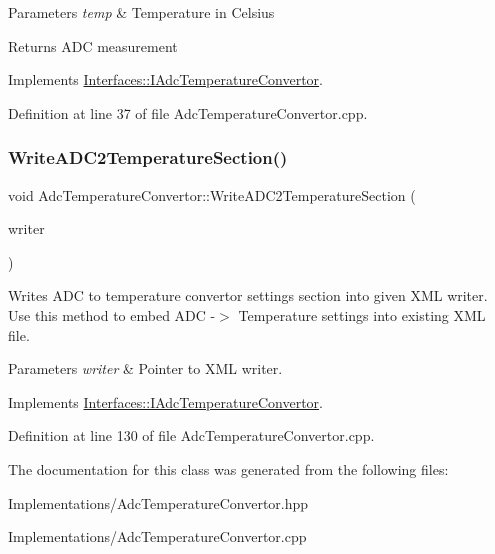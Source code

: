 \begin{DoxyParams}{Parameters}
{\em temp} & Temperature in Celsius \\
\hline
\end{DoxyParams}
\begin{DoxyReturn}{Returns}
A\+DC measurement 
\end{DoxyReturn}


Implements \hyperlink{class_interfaces_1_1_i_adc_temperature_convertor_ab5d3453ecc41848b723a790fe7e01f79}{Interfaces\+::\+I\+Adc\+Temperature\+Convertor}.



Definition at line 37 of file Adc\+Temperature\+Convertor.\+cpp.

\mbox{\label{class_adc_temperature_convertor_aa06c19d0ac9f45d6f2f67718eda042ac}} 
\subsubsection{\texorpdfstring{Write\+A\+D\+C2\+Temperature\+Section()}{WriteADC2TemperatureSection()}}
{\footnotesize\ttfamily void Adc\+Temperature\+Convertor\+::\+Write\+A\+D\+C2\+Temperature\+Section (\begin{DoxyParamCaption}\item[{Q\+Xml\+Stream\+Writer $\ast$}]{writer }\end{DoxyParamCaption})\hspace{0.3cm}{\ttfamily [virtual]}}



Writes A\+DC to temperature convertor settings section into given X\+ML writer. Use this method to embed A\+DC -\/$>$ Temperature settings into existing X\+ML file. 


\begin{DoxyParams}{Parameters}
{\em writer} & Pointer to X\+ML writer. \\
\hline
\end{DoxyParams}


Implements \hyperlink{class_interfaces_1_1_i_adc_temperature_convertor_abc7ed5fdfeaed255af14930431b46ac1}{Interfaces\+::\+I\+Adc\+Temperature\+Convertor}.



Definition at line 130 of file Adc\+Temperature\+Convertor.\+cpp.



The documentation for this class was generated from the following files\+:\begin{DoxyCompactItemize}
\item 
Implementations/Adc\+Temperature\+Convertor.\+hpp\item 
Implementations/Adc\+Temperature\+Convertor.\+cpp\end{DoxyCompactItemize}
